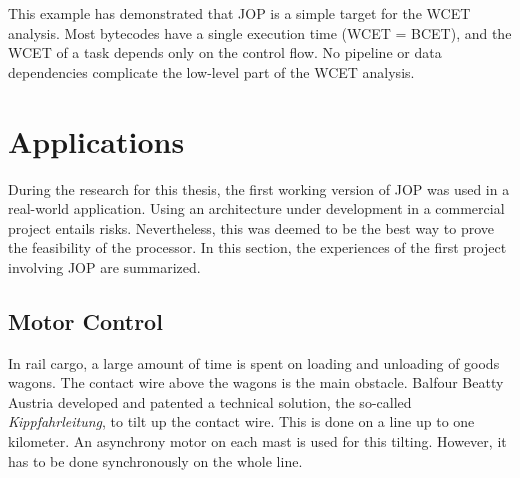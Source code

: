 This example has demonstrated that JOP is a simple target for the
WCET analysis. Most bytecodes have a single execution time (WCET =
BCET), and the WCET of a task depends only on the control flow. No
pipeline or data dependencies complicate the low-level part of the
WCET analysis.

%
%


\section{Applications}
\label{sec:applications}

During the research for this thesis, the first working version of
JOP was used in a real-world application. Using an architecture
under development in a commercial project entails risks.
Nevertheless, this was deemed to be the best way to prove the
feasibility of the processor. In this section, the experiences of
the first project involving JOP are summarized.

\subsection{Motor Control}
\label{sec:app:kfl}

In rail cargo, a large amount of time is spent on loading and
unloading of goods wagons. The contact wire above the wagons is the
main obstacle. Balfour Beatty Austria developed and patented a
technical solution, the so-called \emph{Kippfahrleitung}, to tilt
up the contact wire. This is done on a line up to one kilometer. An
asynchrony motor on each mast is used for this tilting. However, it
has to be done synchronously on the whole line.

